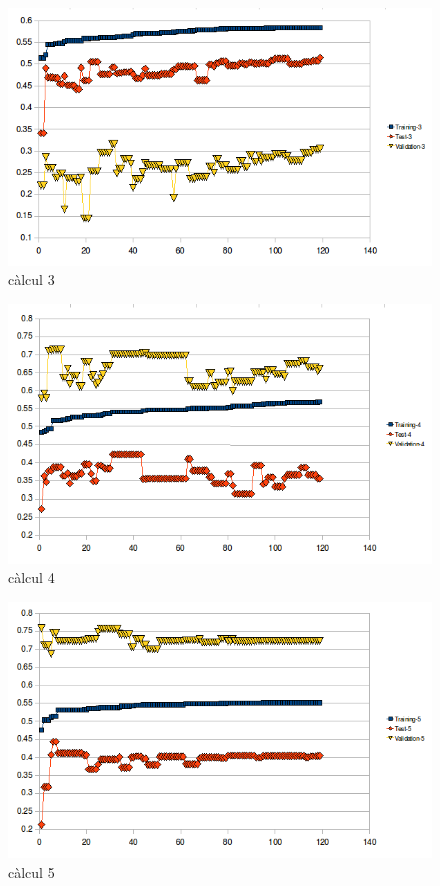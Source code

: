 \documentclass[titlepage,a4paper,12pt]{book}
\begin{document}
\begin{figure}[h]
\begin{center}
\includegraphics[scale=0.75]{pholus/pholus3.png}
\end{center}
\caption{càlcul 3}
\label{fig:pholusResult3}
\end{figure}

\begin{figure}[h]
\begin{center}
\includegraphics[scale=0.75]{pholus/pholus4.png}
\end{center}
\caption{càlcul 4}
\label{fig:pholusResult4}
\end{figure}

\begin{figure}[h]
\begin{center}
\includegraphics[scale=0.75]{pholus/pholus5.png}
\end{center}
\caption{càlcul 5}
\label{fig:pholusResult5}
\end{figure}
\end{document}
